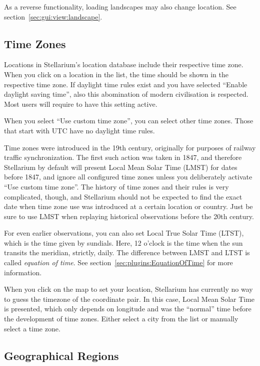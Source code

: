 As a reverse functionality, loading landscapes may also change location. See section~\ref{sec:gui:view:landscape}.

\subsection{Time Zones}
\label{sec:gui:location:timezones}
Locations in Stellarium's location database include their respective
time zone. When you click on a location in
the list, the time should be shown in the respective time zone.  If
daylight time rules exist and you have selected ``Enable daylight
saving time'', also this abomination of modern civilisation is respected. Most
users will require to have this setting active.

When you select ``Use custom time zone'', you can select other time zones.
Those that start with UTC have no daylight time rules.

Time zones were introduced in the 19th century, originally for
purposes of railway traffic synchronization. The first such action was
taken in 1847, and therefore Stellarium by default will present Local
Mean Solar Time (LMST) for dates before 1847, and ignore all
configured time zones unless you deliberately activate ``Use custom
time zone''. The history of time zones and their rules is very
complicated, though, and Stellarium should not be expected to find the
exact date when time zone use was introduced at a certain location or
country. Just be sure to use LMST when replaying historical
observations before the 20th century.

For even earlier observations, you can also set Local True Solar Time
(LTST), which is the time given by sundials. Here, 12 o'clock is the
time when the sun transits the meridian, strictly, daily. The
difference between LMST and LTST is called \emph{equation of time}. 
See section~\ref{sec:plugins:EquationOfTime} for more information.

When you click on the map to set your location, Stellarium has
currently no way to guess the timezone of the coordinate pair. In this
case, Local Mean Solar Time is presented, which only depends on
longitude and was the ``normal'' time before the development of time
zones. Either select a city from the list or manually select a time
zone.

\subsection{Geographical Regions}
\label{sec:gui:location:geographicalregions}

